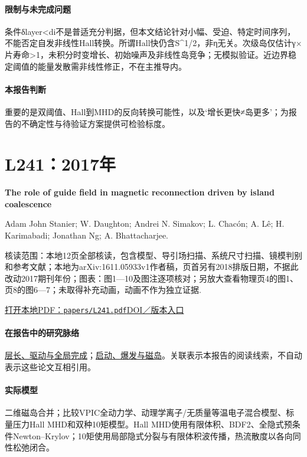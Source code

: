 \documentclass[UTF8,a4paper,11pt,openany,fontset=fandol]{ctexbook}
\begin{document}
\paragraph{限制与未完成问题}条件δlayer<di不是普适充分判据，但本文结论针对小幅、受迫、特定时间序列，不能否定自发非线性Hall转换。所谓Hall快仍含S\textasciicircum{}1/2，非η无关。次级岛仅估计γ×片寿命>1，未积分时变增长、初始噪声及非线性岛竞争；无模拟验证。近边界稳定阈值的能量发散需非线性修正，不在主推导内。

\paragraph{本报告判断}重要的是双阈值、Hall到MHD的反向转换可能性，以及‘增长更快≠岛更多’；为报告的不确定性与待验证方案提供可检验标度。

\section{L241：2017年}\label{paper:L241}

\textbf{The role of guide field in magnetic reconnection driven by island coalescence}\citep{L241}\

Adam  John Stanier;  W. Daughton;  Andrei N. Simakov;  L. Chacón;  A. Lê;  H. Karimabadi;  Jonathan Ng;  A. Bhattacharjee.

\textsf{核读范围：}本地12页全部核读，包含模型、导引场扫描、系统尺寸扫描、镜模判别和参考文献；本地为arXiv:1611.05933v1作者稿，页首另有2018排版日期，不据此改动2017期刊年份；\textsf{图表：}图1—10及图注逐项核对；另放大查看物理页4的图1、页8的图6—7；未取得补充动画，动画不作为独立证据.

\href{run:../papers/L241.pdf}{打开本地PDF：\texttt{papers/L241.pdf}}\quad\href{https://doi.org/10.1063/1.4976712}{DOI／版本入口}

\paragraph{在报告中的研究脉络}\hyperref[story:global]{层长、驱动与全局完成}；\hyperref[story:onset]{启动、爆发与磁岛}。关联表示本报告的阅读线索，不自动表示这些论文互相引用。

\paragraph{实际模型}二维磁岛合并；比较VPIC全动力学、动理学离子/无质量等温电子混合模型、标量压力Hall MHD和双种10矩模型。Hall MHD使用有限体积、BDF2、全隐式预条件Newton–Krylov；10矩使用局部隐式分裂与有限体积波传播，热流散度以各向同性松弛闭合。
\end{document}
